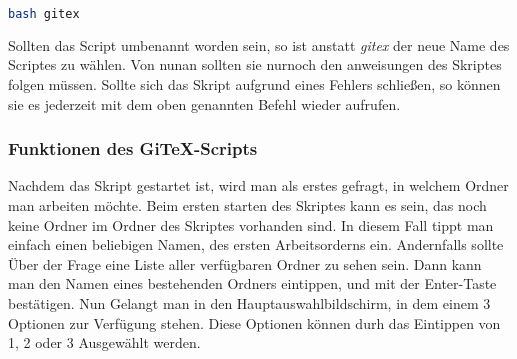 \documentclass[12pt,a4paper]{scrartcl}
\begin{document}
\begin{lstlisting}[language=bash]
bash gitex
\end{lstlisting}
Sollten das Script umbenannt worden sein, so ist anstatt \emph{gitex} der neue Name des Scriptes zu wählen. Von nunan sollten sie nurnoch den anweisungen des Skriptes folgen müssen. Sollte sich das Skript aufgrund eines Fehlers schließen, so können sie es jederzeit mit dem oben genannten Befehl wieder aufrufen.

\subsubsection{Funktionen des GiTeX-Scripts}

Nachdem das Skript gestartet ist, wird man als erstes gefragt, in welchem Ordner man arbeiten möchte. Beim ersten starten des Skriptes kann es sein, das noch keine Ordner im Ordner des Skriptes vorhanden sind. In diesem Fall tippt man einfach einen beliebigen Namen, des ersten Arbeitsorderns ein. Andernfalls sollte Über der Frage eine Liste aller verfügbaren Ordner zu sehen sein. Dann kann man den Namen eines bestehenden Ordners eintippen, und mit der Enter-Taste bestätigen. Nun Gelangt man in den Hauptauswahlbildschirm, in dem einem 3 Optionen zur Verfügung stehen. Diese Optionen können durh das Eintippen von 1, 2 oder 3 Ausgewählt werden. 
\end{document}
